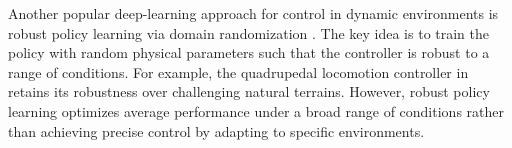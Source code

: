 Another popular deep-learning approach for control in dynamic environments is robust policy learning via domain randomization \cite{lee2020learning,tobin2017domain,ramos2019bayessim}. The key idea is to train the policy with random physical parameters such that the controller is robust to a range of conditions. For example, the quadrupedal locomotion controller in~\cite{lee2020learning} retains its robustness over challenging natural terrains. 
However, robust policy learning optimizes average performance under a broad range of conditions rather than achieving precise control by adapting to specific environments.
